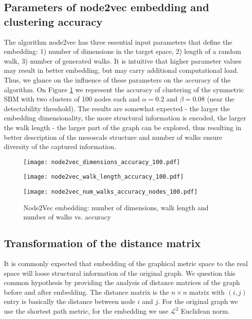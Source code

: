 \subsection{Parameters of node2vec embedding and clustering accuracy}
The algorithm node2vec has three essential input parameters that define the embedding: 1) number of dimensions in the target space, 2) length of a random walk, 3) number of generated walks. It is intuitive that higher parameter values may result in better embedding, but may carry additional computational load. Thus, we glance on the influence of these parameters on the accuracy of the algorithm. On Figure \ref{fig.params_node2vec} we represent the accuracy of clustering of the symmetric SBM with two clusters of 100 nodes each and $\alpha=0.2$ and $\beta = 0.08$ (near the detectability threshold). The results are somewhat expected - the larger the embedding dimensionality, the more structural information is encoded, the larger the walk length - the larger part of the graph can be explored, thus resulting in better description of the mesoscale structure and number of walks ensure diversity of the captured information.
\begin{figure}[ht]
\centering
\begin{minipage}[b]{0.32\textwidth}
\centering
\texttt{[image: node2vec\_dimensions\_accuracy\_100.pdf]}
\end{minipage}\hfill
\begin{minipage}[b]{0.32\textwidth}
\centering
\texttt{[image: node2vec\_walk\_length\_accuracy\_100.pdf]}
\end{minipage}\hfill
\begin{minipage}[b]{0.32\textwidth}
\centering
\texttt{[image: node2vec\_num\_walks\_accuracy\_nodes\_100.pdf]}
\end{minipage}
\caption{Node2Vec embedding: number of dimensions, walk length and number of walks vs. accuracy}
\label{fig.params_node2vec}
\end{figure}

\subsection{Transformation of the distance matrix}
It is commonly expected that embedding of the graphical metric space to the real space will loose structural information of the original graph. We question this common hypothesis by providing the analysis of distance matrices of the graph before and after embedding. The distance matrix is the $n\times n$ matrix with $(i,j)$ entry is basically the distance between node $i$ and $j$. For the original graph we use the shortest path metric, for the embedding we use $\mathcal{L}^2$ Euclidean norm. 

